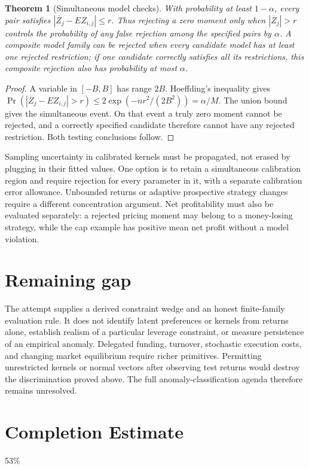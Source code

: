 \documentclass[11pt]{article}
\newtheorem{theorem}{Theorem}
\theoremstyle{definition}
\begin{document}
\begin{theorem}[Simultaneous model checks]
With probability at least $1-\alpha$, every pair satisfies
$|\overline Z_j-E Z_{i,j}|\le r$. Thus rejecting a zero moment only when $|\overline Z_j|>r$ controls the probability of any false rejection among the specified pairs by $\alpha$. A composite model family can be rejected when every candidate model has at least one rejected restriction; if one candidate correctly satisfies all its restrictions, this composite rejection also has probability at most $\alpha$.
\end{theorem}
\begin{proof}
A variable in $[-B,B]$ has range $2B$. Hoeffding's inequality gives
$\Pr(|\overline Z_j-E Z_{i,j}|>r)\le2\exp(-nr^2/(2B^2))=\alpha/M$.
The union bound gives the simultaneous event. On that event a truly zero moment cannot be rejected, and a correctly specified candidate therefore cannot have any rejected restriction. Both testing conclusions follow.
\end{proof}
Sampling uncertainty in calibrated kernels must be propagated, not erased by plugging in their fitted values. One option is to retain a simultaneous calibration region and require rejection for every parameter in it, with a separate calibration error allowance. Unbounded returns or adaptive prospective strategy changes require a different concentration argument. Net profitability must also be evaluated separately: a rejected pricing moment may belong to a money-losing strategy, while the cap example has positive mean net profit without a model violation.

\section*{Remaining gap}
The attempt supplies a derived constraint wedge and an honest finite-family evaluation rule. It does not identify latent preferences or kernels from returns alone, establish realism of a particular leverage constraint, or measure persistence of an empirical anomaly. Delegated funding, turnover, stochastic execution costs, and changing market equilibrium require richer primitives. Permitting unrestricted kernels or normal vectors after observing test returns would destroy the discrimination proved above. The full anomaly-classification agenda therefore remains unresolved.

\section{Completion Estimate}
53\%
\end{document}
